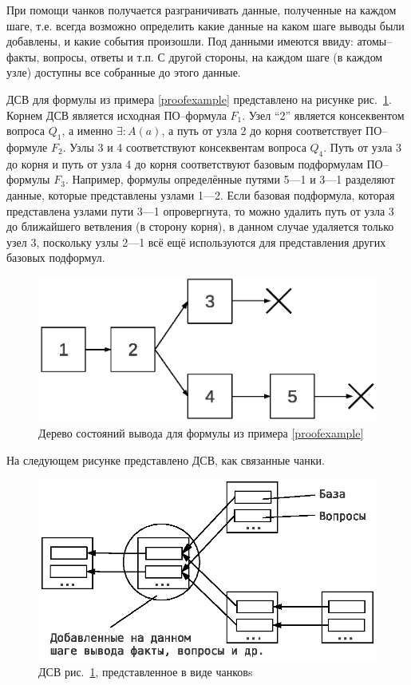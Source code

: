 При помощи чанков получается разграничивать данные, полученные на каждом шаге, т.е. всегда возможно определить какие данные на каком шаге выводы были добавлены, и какие события произошли. Под данными имеются ввиду: атомы--факты, вопросы, ответы и т.п. С другой стороны, на каждом шаге (в каждом узле) доступны все собранные до этого данные.

ДСВ для формулы из примера \ref{proofexample} представлено на рисунке рис.~\ref{fig:pst}. Корнем ДСВ является исходная ПО--формула $F_1$. Узел ``2'' является консеквентом вопроса $Q_1$, а именно $\exists\colon A(a)$, а путь от узла 2 до корня соответствует ПО--формуле $F_2$. Узлы 3 и 4 соответствуют консеквентам вопроса $Q_4$. Путь от узла 3 до корня и путь от узла 4 до корня соответствуют базовым подформулам ПО--формулы $F_3$. Например, формулы определённые путями 5---1 и 3---1 разделяют данные, которые представлены узлами 1---2. Если базовая подформула, которая представлена узлами пути 3---1 опровергнута, то можно удалить путь от узла 3 до ближайшего ветвления (в сторону корня), в данном случае удаляется только узел 3, поскольку узлы 2---1 всё ещё используются для представления других базовых подформул.
\begin{figure}[h]
	\centering
	\includegraphics[width=0.4\linewidth]{pics/PST.eps}
	\caption{Дерево состояний вывода для формулы из примера \ref{proofexample}}
	\label{fig:pst}
\end{figure}
На следующем рисунке представлено ДСВ, как связанные чанки.
\begin{figure}[h]
	\centering
	\includegraphics[width=0.6\linewidth]{pics/PST2.eps}
	\caption{ДСВ рис.~\ref{fig:pst}, представленное в виде чанковs}
	\label{fig:pst2}
\end{figure}

